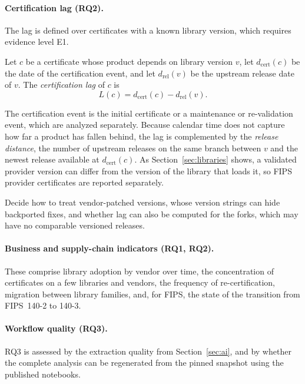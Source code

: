 \paragraph{Certification lag (RQ2).} The lag is defined over certificates with a known
library version, which requires evidence level E1.

\begin{definition}
  Let $c$ be a certificate whose product depends on library version $v$, let
  $d_{\mathrm{cert}}(c)$ be the date of the certification event, and let
  $d_{\mathrm{rel}}(v)$ be the upstream release date of $v$. The
  \emph{certification lag} of $c$ is
  \begin{equation}
    L(c) = d_{\mathrm{cert}}(c) - d_{\mathrm{rel}}(v).
    \label{eq:lag}
  \end{equation}
\end{definition}

The certification event is the initial certificate or a maintenance
or re-validation event, which are analyzed separately. Because calendar time does not
capture how far a product has fallen behind, the lag is complemented by the
\emph{release distance}, the number of upstream releases on the same branch
between $v$ and the newest release available at $d_{\mathrm{cert}}(c)$. As
Section~\ref{sec:libraries} shows, a validated provider version can differ from
the version of the library that loads it, so FIPS provider certificates are
reported separately.

{Decide how to treat vendor-patched versions, whose version strings can hide
backported fixes, and whether lag can also be computed for the forks, which may
have no comparable versioned releases.}

\paragraph{Business and supply-chain indicators (RQ1, RQ2).} These comprise library
adoption by vendor over time, the concentration of certificates on a few libraries
and vendors, the frequency of re-certification, migration between library families,
and, for FIPS, the state of the transition from FIPS~140-2 to 140-3.

\paragraph{Workflow quality (RQ3).} RQ3 is assessed by the extraction quality from
Section~\ref{sec:ai}, and by whether the complete analysis can be regenerated from
the pinned snapshot using the published notebooks.

